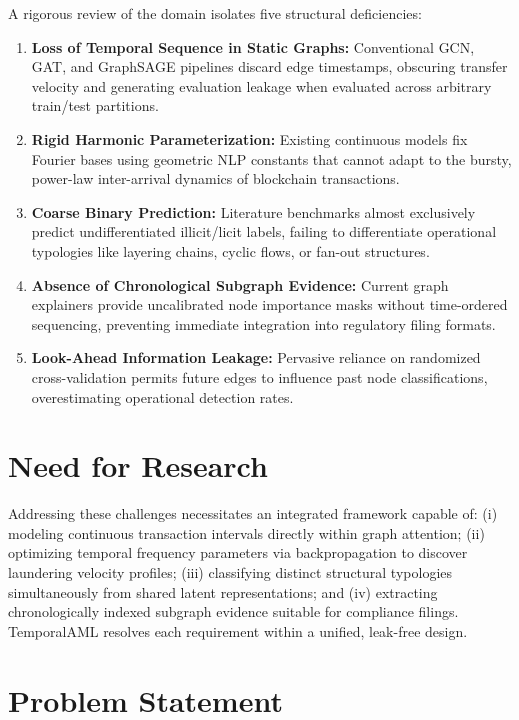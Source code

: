 A rigorous review of the domain isolates five structural deficiencies:

\begin{enumerate}
	\item \textbf{Loss of Temporal Sequence in Static Graphs:} Conventional GCN, GAT, and GraphSAGE pipelines discard edge timestamps, obscuring transfer velocity and generating evaluation leakage when evaluated across arbitrary train/test partitions.
	\item \textbf{Rigid Harmonic Parameterization:} Existing continuous models fix Fourier bases using geometric NLP constants that cannot adapt to the bursty, power-law inter-arrival dynamics of blockchain transactions.
	\item \textbf{Coarse Binary Prediction:} Literature benchmarks almost exclusively predict undifferentiated illicit/licit labels, failing to differentiate operational typologies like layering chains, cyclic flows, or fan-out structures.
	\item \textbf{Absence of Chronological Subgraph Evidence:} Current graph explainers provide uncalibrated node importance masks without time-ordered sequencing, preventing immediate integration into regulatory filing formats.
	\item \textbf{Look-Ahead Information Leakage:} Pervasive reliance on randomized cross-validation permits future edges to influence past node classifications, overestimating operational detection rates.
\end{enumerate}


\section{Need for Research}
\label{sec:need_for_research}

Addressing these challenges necessitates an integrated framework capable of: (i) modeling continuous transaction intervals directly within graph attention; (ii) optimizing temporal frequency parameters via backpropagation to discover laundering velocity profiles; (iii) classifying distinct structural typologies simultaneously from shared latent representations; and (iv) extracting chronologically indexed subgraph evidence suitable for compliance filings. TemporalAML resolves each requirement within a unified, leak-free design.


\section{Problem Statement}
\label{sec:lit_problem_statement}

